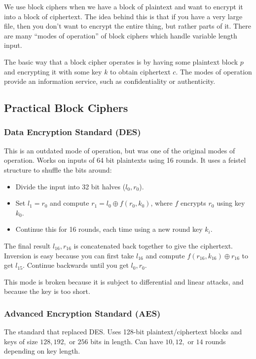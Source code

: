 \documentclass[psamsfonts]{amsart}
\begin{document}
We use block ciphers when we have a block of plaintext and want to encrypt it into a block of ciphertext. The idea behind this is that if you have a very large file, then you don't want to encrypt the entire thing, but rather parts of it. There are many ``modes of operation'' of block ciphers which handle variable length input.

The basic way that a block cipher operates is by having some plaintext block $p$ and encrypting it with some key $k$ to obtain ciphertext $c$. The modes of operation provide an information service, such as confidentiality or authenticity.

\subsection{Practical Block Ciphers}

\subsubsection{Data Encryption Standard (DES)}

This is an outdated mode of operation, but was one of the original modes of operation. Works on inputs of 64 bit plaintexts using 16 rounds. It uses a feistel structure to shuffle the bits around:
\begin{itemize}
  \item Divide the input into 32 bit halves ($l_0, r_0$).
  \item Set $l_1 = r_0$ and compute $r_1 = l_0 \oplus f(r_0, k_0)$, where $f$ encrypts $r_0$ using key $k_0$.
  \item Continue this for 16 rounds, each time using a new round key $k_i$.
\end{itemize}

The final result $l_{16}, r_{16}$ is concatenated back together to give the ciphertext. Inversion is easy because you can first take $l_{16}$ and compute $f(r_{16}, k_{16}) \oplus r_{16}$ to get $l_{15}$. Continue backwards until you get $l_0, r_0$.

This mode is broken because it is subject to differential and linear attacks, and because the key is too short.

\subsubsection{Advanced Encryption Standard (AES)}

The standard that replaced DES. Uses 128-bit plaintext/ciphertext blocks and keys of size $128, 192,$ or $256$ bits in length. Can have $10, 12,$ or $14$ rounds depending on key length.
\end{document}
